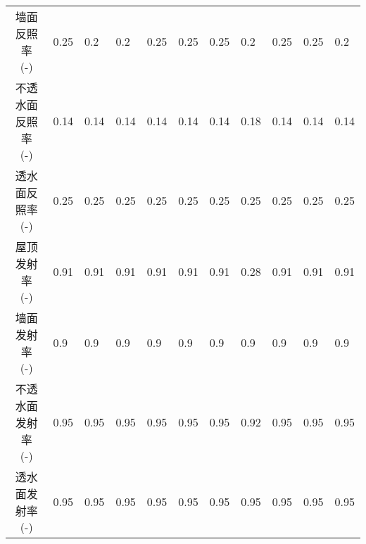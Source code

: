 \begin{landscape}
\begin{table}[htbp]
\begin{tabular}{@{}cllllllllll@{}}
      \makecell{墙面反照率     \\ {(-)}}                      & 0.25                 & 0.2                  & 0.2                 & 0.25                & 0.25                & 0.25                 & 0.2                  & 0.25                & 0.25                  & 0.2                  \\
      \makecell{不透水面反照率 \\ {(-)}}                      & 0.14                 & 0.14                 & 0.14                & 0.14                & 0.14                & 0.14                 & 0.18                 & 0.14                & 0.14                  & 0.14                 \\
      \makecell{透水面反照率   \\ {(-)}}                      & 0.25                 & 0.25                 & 0.25                & 0.25                & 0.25                & 0.25                 & 0.25                 & 0.25                & 0.25                  & 0.25                 \\
      \makecell{屋顶发射率     \\ {(-)}}                      & 0.91                 & 0.91                 & 0.91                & 0.91                & 0.91                & 0.91                 & 0.28                 & 0.91                & 0.91                  & 0.91                 \\
      \makecell{墙面发射率     \\ {(-)}}                      & 0.9                  & 0.9                  & 0.9                 & 0.9                 & 0.9                 & 0.9                  & 0.9                  & 0.9                 & 0.9                   & 0.9                  \\
      \makecell{不透水面发射率 \\ {(-)}}                      & 0.95                 & 0.95                 & 0.95                & 0.95                & 0.95                & 0.95                 & 0.92                 & 0.95                & 0.95                  & 0.95                 \\
      \makecell{透水面发射率   \\ {(-)}}                      & 0.95                 & 0.95                 & 0.95                & 0.95                & 0.95                & 0.95                 & 0.95                 & 0.95                & 0.95                  & 0.95                 \\

\end{tabular}
\end{table}
\end{landscape}
